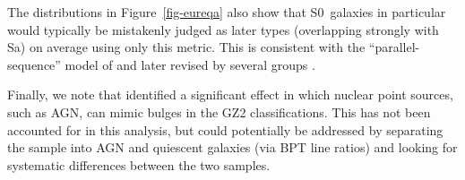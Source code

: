 \documentclass[useAMS,usenatbib]{mn2e}
\begin{document}
The distributions in Figure~\ref{fig-eureqa} also show that S0~galaxies in particular would typically be mistakenly judged as later types (overlapping strongly with Sa) on average using only this metric. This is consistent with the ``parallel-sequence'' model of \citet{van76} and later revised by several groups \citep[including][]{cap11,lau11,kor12}. 

Finally, we note that \citet{sim13} identified a significant effect in which nuclear point sources, such as AGN, can mimic bulges in the GZ2 classifications. This has not been accounted for in this analysis, but could potentially be addressed by separating the sample into AGN and quiescent galaxies (via BPT line ratios) and looking for systematic differences between the two samples. 

%
%
%
%

%
\end{document}

